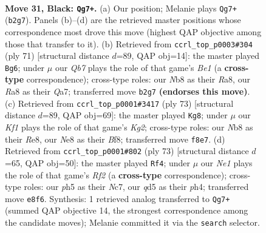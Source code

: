 \documentclass[11pt]{article}
\begin{document}
\clearpage

\begin{figure}[p]\centering
\begin{subfigure}{0.46\textwidth}\centering
\resizebox{\linewidth}{!}{%
\newchessgame
\chessboard[
  setfen={rn2nk2/1p5p/7p/p1PQ1p1P/P6P/1N6/1q6/RN4K1 b - - 0 31},
  showmover=false,
  pgfstyle=straightmove, color=movearrow, markmove={b2-g7}
]}
\caption{}
\end{subfigure}\hfill
\begin{subfigure}{0.46\textwidth}\centering
\resizebox{\linewidth}{!}{%
\newchessgame
\chessboard[
  setfen={r3b3/q5Pk/4p2p/1p6/1NP2P1P/1P1R4/1K6/4Q3 b - - 0 36},
  showmover=false,
  pgfstyle=straightmove, color=movearrow, markmove={e8-g6}
]}
\caption{}
\end{subfigure}
\\[4pt]
\begin{subfigure}{0.46\textwidth}\centering
\resizebox{\linewidth}{!}{%
\newchessgame
\chessboard[
  setfen={4rb2/5pk1/8/2pPPQ1p/1p3p1P/1P6/2R3K1/1qN5 b - - 2 37},
  showmover=false,
  pgfstyle=straightmove, color=movearrow, markmove={g7-g8}
]}
\caption{}
\end{subfigure}\hfill
\begin{subfigure}{0.46\textwidth}\centering
\resizebox{\linewidth}{!}{%
\newchessgame
\chessboard[
  setfen={6k1/2n2r2/3p4/P2Pp2p/7P/3RQPp1/2qN2K1/8 b - - 1 37},
  showmover=false,
  pgfstyle=straightmove, color=movearrow, markmove={f7-f4}
]}
\caption{}
\end{subfigure}
\caption{\textbf{Move 31, Black: \texttt{Qg7+}.} (a) Our position; Melanie plays \texttt{Qg7+} (\texttt{b2g7}). Panels (b)--(d) are the retrieved master positions whose correspondence most drove this move (highest QAP objective among those that transfer to it). (b) Retrieved from \texttt{ccrl\_top\_p0003\#304} (ply 71) [structural distance $d$=89, QAP obj=14]: the master played \texttt{Bg6}; under $\mu$ our \emph{Qb7} plays the role of that game's \emph{Be1} (a \textbf{cross-type} correspondence); cross-type roles: our \emph{N}b8 as their \emph{R}a8, our \emph{R}a8 as their \emph{Q}a7; transferred move \texttt{b2g7} \textbf{(endorses this move)}. (c) Retrieved from \texttt{ccrl\_top\_p0001\#3417} (ply 73) [structural distance $d$=89, QAP obj=69]: the master played \texttt{Kg8}; under $\mu$ our \emph{Kf1} plays the role of that game's \emph{Kg2}; cross-type roles: our \emph{N}b8 as their \emph{R}e8, our \emph{N}e8 as their \emph{B}f8; transferred move \texttt{f8e7}. (d) Retrieved from \texttt{ccrl\_top\_p0001\#802} (ply 73) [structural distance $d$=65, QAP obj=50]: the master played \texttt{Rf4}; under $\mu$ our \emph{Ne1} plays the role of that game's \emph{Rf2} (a \textbf{cross-type} correspondence); cross-type roles: our \emph{p}h5 as their \emph{N}c7, our \emph{q}d5 as their \emph{p}h4; transferred move \texttt{e8f6}. Synthesis: 1 retrieved analog transferred to \texttt{Qg7+} (summed QAP objective 14, the strongest correspondence among the candidate moves); Melanie committed it via the \texttt{search} selector.}
\label{fig:thought-m61}
\end{figure}
\end{document}
